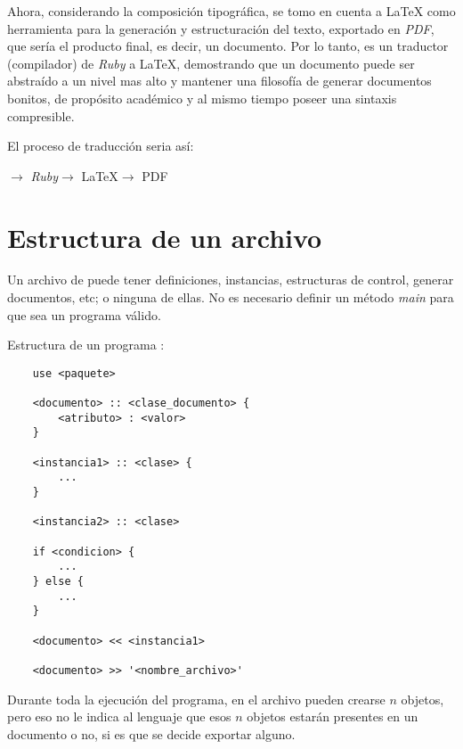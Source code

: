 \documentclass[12pt,letterpaper,titlepage,oneside,openright]{book}
\newcommand{\OhTeX}{%
    \makebox[0.76em][c]{O}%
    \makebox[0.25em][c]{%
        \raisebox{0.14em}[0em][0em]{%
            \fontsize{0.5em}{0cm}%
                \selectfont H%
        }%
    }%
    \makebox[1.35em][c]{\TeX}%
}
\newcommand{\latex}{\LaTeX\xspace}
\newcommand{\ohtex}{\OhTeX\xspace}
\newcommand{\ruby}{\textit{Ruby}\xspace}
\begin{document}
Ahora, considerando la composición tipográfica, se tomo en cuenta a \latex como
herramienta para la generación y estructuración del texto, exportado en
\textit{PDF}, que sería el producto final, es decir, un documento. Por lo tanto,
\ohtex es un traductor (compilador) de \ruby a \latex, demostrando que un
documento puede ser abstraído a un nivel mas alto y mantener una filosofía de
generar documentos bonitos, de propósito académico y al mismo tiempo poseer una sintaxis compresible.

El proceso de traducción seria así:

\begin{center}
    \ohtex $\longrightarrow$ \ruby $\longrightarrow$ \latex $\longrightarrow$ PDF
\end{center}

\section[Estructura de un archivo OhTeX]{Estructura de un archivo \ohtex}

Un archivo de \ohtex puede tener definiciones, instancias, estructuras de control, generar documentos, etc; o ninguna de ellas. No es necesario definir un método \textit{main} para que sea un programa válido.

Estructura de un programa \ohtex:

\begin{center}
\begin{minipage}{\linewidth}
\begin{lstlisting}
    use <paquete>

    <documento> :: <clase_documento> {
        <atributo> : <valor> 
    }

    <instancia1> :: <clase> {
        ...
    }

    <instancia2> :: <clase>

    if <condicion> {
        ...
    } else {
        ...
    }

    <documento> << <instancia1>

    <documento> >> '<nombre_archivo>'
\end{lstlisting}
\end{minipage}
\end{center}

Durante toda la ejecución del programa, en el archivo pueden crearse $n$
objetos, pero eso no le indica al lenguaje que esos $n$ objetos estarán
presentes en un documento o no, si es que se decide exportar alguno.
\end{document}

